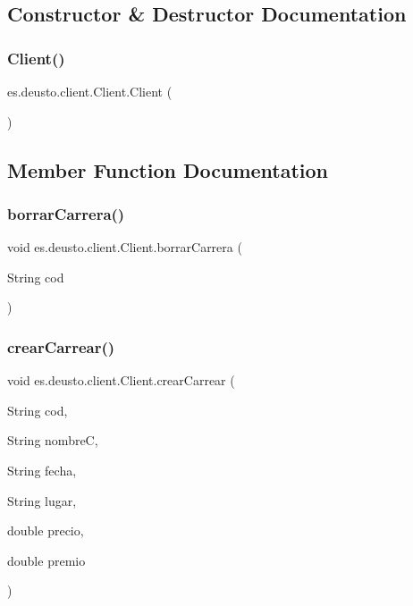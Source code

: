 \subsection{Constructor \& Destructor Documentation}
\mbox{\label{classes_1_1deusto_1_1client_1_1_client_a71c03e318a72447da873297f3364f67f}} 
\subsubsection{\texorpdfstring{Client()}{Client()}}
{\footnotesize\ttfamily es.\+deusto.\+client.\+Client.\+Client (\begin{DoxyParamCaption}{ }\end{DoxyParamCaption})}



\subsection{Member Function Documentation}
\mbox{\label{classes_1_1deusto_1_1client_1_1_client_aff43677afc5d700af05c4cd6df9abd67}} 
\subsubsection{\texorpdfstring{borrarCarrera()}{borrarCarrera()}}
{\footnotesize\ttfamily void es.\+deusto.\+client.\+Client.\+borrar\+Carrera (\begin{DoxyParamCaption}\item[{String}]{cod }\end{DoxyParamCaption})}

\mbox{\label{classes_1_1deusto_1_1client_1_1_client_a0efc9ad350a61ae5277827eb1964b890}} 
\subsubsection{\texorpdfstring{crearCarrear()}{crearCarrear()}}
{\footnotesize\ttfamily void es.\+deusto.\+client.\+Client.\+crear\+Carrear (\begin{DoxyParamCaption}\item[{String}]{cod,  }\item[{String}]{nombreC,  }\item[{String}]{fecha,  }\item[{String}]{lugar,  }\item[{double}]{precio,  }\item[{double}]{premio }\end{DoxyParamCaption})}

